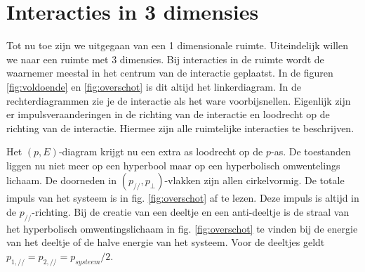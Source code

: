 \newpage{}

\section{Interacties in 3 dimensies}

Tot nu toe zijn we uitgegaan van een 1 dimensionale ruimte. Uiteindelijk willen we naar een ruimte met 3 dimensies. Bij interacties in de ruimte wordt de waarnemer meestal in het centrum van de interactie geplaatst. In de figuren \ref{fig:voldoende} en \ref{fig:overschot} is dit altijd het linkerdiagram. In de rechterdiagrammen zie je de interactie als het ware voorbijsnellen. Eigenlijk zijn er impulsveraanderingen in de richting van de interactie en loodrecht op de richting van de interactie. Hiermee zijn alle ruimtelijke interacties te beschrijven.

Het $(p,E)$-diagram krijgt nu een extra as loodrecht op de $p$-as. De toestanden liggen nu niet meer op een hyperbool maar op een hyperbolisch omwentelings lichaam. De doorneden in $\left(p_{//},p_{\perp}\right)$-vlakken zijn allen cirkelvormig. De totale impuls van het systeem is in fig. \ref{fig:overschot} af te lezen. Deze impuls is altijd in de $p_{//}$-richting. Bij de creatie van een deeltje en een anti-deeltje is de straal van het hyperbolisch omwentingslichaam in fig. \ref{fig:overschot} te vinden bij de energie van het deeltje of de halve energie van het systeem. Voor de deeltjes geldt $p_{1,//}=p_{2,//}=p_{systeem}/2$.

